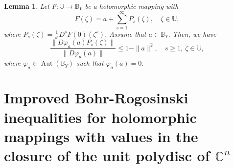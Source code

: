 \documentclass{birkjour}
\theoremstyle{plain}
\newtheorem{lem}{Lemma}
\theoremstyle{definition}
\theoremstyle{definition}
\begin{document}
\begin{lem}\cite{ref22}
	Let $F\colon \mathbb{U}\to \mathbb{B}_Y$ be a holomorphic mapping with
	\begin{equation*}
	F(\zeta) = a + \sum_{s=1}^{\infty} P_s(\zeta),\quad \zeta\in \mathbb{U},
    \end{equation*}
	where $P_s(\zeta) = \frac{1}{s!} D^s F(0)(\zeta^s)$. Assume that $a\in \mathbb{B}_Y$. Then, we have
	\begin{equation*}
	\frac{\|D\varphi_a(a)P_s(\zeta)\|}{\|D\varphi_a(a)\|} \le 1-\|a\|^2,\quad s\ge 1,\ \zeta\in \mathbb{U},
    \end{equation*}
	where $\varphi_a\in \operatorname{Aut}(\mathbb{B}_Y)$ such that $\varphi_a(a)=0$.
\end{lem}

\section{Improved Bohr-Rogosinski inequalities for holomorphic mappings with values in the closure of the unit polydisc of ${\mathbb{C}}^n $}\label{sec3}
\end{document}
